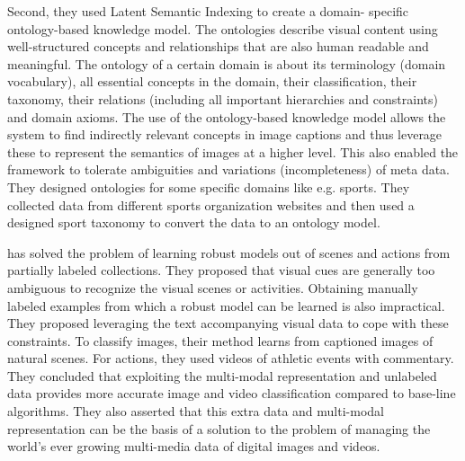Second, they used Latent Semantic Indexing to create a domain-
specific ontology-based knowledge model. The ontologies describe
visual content using well-structured concepts and relationships that
are also human readable and meaningful. The ontology of a certain
domain is about its terminology (domain vocabulary), all essential
concepts in the domain, their classification, their taxonomy, their
relations (including all important hierarchies and constraints) and
domain axioms. The use of the ontology-based knowledge model allows
the system to find indirectly relevant concepts in image captions
and thus leverage these to represent the semantics of images at a
higher level. This also enabled the framework to tolerate
ambiguities and variations (incompleteness) of meta data. They
designed ontologies for some specific domains like e.g. sports. They
collected data from different sports organization websites and then
used a designed sport taxonomy to convert the data to an ontology model.


\citet*{gupta} has solved the problem of learning robust models out
of scenes and actions from partially labeled collections. They
proposed that visual cues are generally too ambiguous to recognize
the visual scenes or activities. Obtaining manually labeled
examples from which a robust model can be learned is also impractical.
They proposed leveraging the text accompanying visual data to
cope with these constraints. To classify images, their method learns
from captioned images of natural scenes. For actions, they used
videos of athletic events with commentary. They concluded that
exploiting the multi-modal representation and unlabeled data
provides more accurate image and video classification compared to
base-line algorithms. They also asserted that this extra data and
multi-modal representation can be the basis of a solution to the
problem of managing the world's ever growing multi-media data of
digital images and videos.


